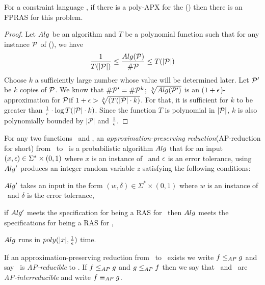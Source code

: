 \begin{lemma}[Hedayaty 2012]
For a constraint language \mrelset, if there is a poly-APX for
the \ccsp(\mrelset) then there is an FPRAS for this problem.
\end{lemma}

\begin{proof}
Let \(Alg\) be an algorithm and \(T\) be a polynomial function such
that for any instance \(\mathcal{P}\)
of \ccsp(\mrelset), we have 
\[\frac{1}{T(|\mathcal{P}|)} \le \frac{Alg(\mathcal{P})}{\#\mathcal{P}} \le T(|\mathcal{P}|)\]
Choose \(k\) a sufficiently large number whose value
will be determined later. Let \(\mathcal{P}'\) be \(k\) copies of \(\mathcal{P}\)\@.
We know that \(\#\mathcal{P}'=\#\mathcal{P}^k\); \(\sqrt[k]{Alg(\mathcal{P}')}\) is 
an (\(1+\epsilon\))-approximation for \(\mathcal{P}\)\@ if \(1+\epsilon > \sqrt[k]{(T(|\mathcal{P}|\cdot k)}\)\@.
For that, it is sufficient for \(k\) to be greater than
\(\frac{1}{\epsilon}\cdot \log T(|\mathcal{P}|\cdot k)\)\@.
Since the function \(T\) is polynomial in \(|\mathcal{P}|\), \(k\) is also polynomially 
bounded by \(|\mathcal{P}|\) and \(\frac{1}{\epsilon}\)\@.
\end{proof}

\begin{defi}[AP-reduction]
For any two functions \mf\ and \mg, 
an \emph{approximation-preserving reduction}(AP-reduction for short)
from \mf\ to \mg\ is a probabilistic algorithm \(Alg\) that for an input 
\((x,\epsilon) \in \Sigma^*\times(0,1)\) where \(x\) is an instance of \mf\ and \(\epsilon\) 
is an error tolerance, using \(Alg'\) produces an integer random variable \(z\)
satisfying the following  conditions: \begin{inparaenum}[(i)] \item \(Alg'\) takes 
an input in the form \((w,\delta) \in \Sigma^*\times(0,1)\) where \(w\) is an instance of \mg\
and \(\delta\) is the error tolerance, \item if \(Alg'\) meets the specification for
being a RAS for \mg\ then \(Alg\) meets the specifications for being a RAS for \mf, \item
\(Alg\) runs in \(poly(|x|,\frac{1}{\epsilon})\) time.
\end{inparaenum}
\end{defi}

If an approximation-preserving reduction from \mf\ to \mg\ exists we write \(f \le_{AP} g\)
and say \mf\ is \emph{AP-reducible} to \mg. If \(f \le_{AP} g\) and \(g \le_{AP} f\)
then we say that  \mf\ and \mg\ are \emph{AP-interreducible} and write \(f \equiv_{AP} g\)\@. 


